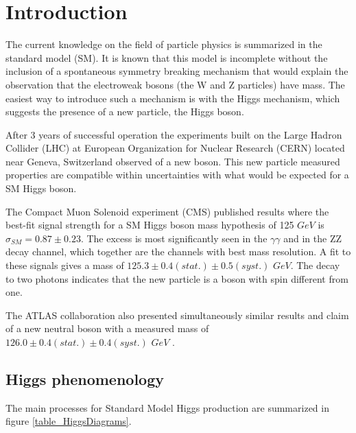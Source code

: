 \documentclass[%
reprint,
amsmath,
amssymb,
aps,
pra,
showkeys
]{revtex4-1}
\begin{document}
\setlength{\unitlength}{1mm}

\section{Introduction}

The current knowledge on the field of particle physics is summarized in the standard model (SM). It is known that
this model is incomplete without the inclusion of a spontaneous symmetry breaking mechanism that would explain
the observation that the electroweak bosons (the W and Z particles) have mass. The easiest way to introduce such
a mechanism is with the Higgs mechanism, which suggests the presence of a new particle, the Higgs boson.

After 3 years of successful operation the experiments built on the Large Hadron Collider (LHC) at European Organization 
for Nuclear Research (CERN) located near Geneva, Switzerland observed of a new boson. This new particle measured 
properties are compatible within uncertainties with what would be expected for a SM Higgs boson.

The Compact Muon Solenoid experiment (CMS) published results where the best-fit signal strength for a SM Higgs boson 
mass hypothesis of 125 $GeV$ is $\sigma_{SM}=0.87\pm0.23$. The excess is most significantly seen in the $\gamma\gamma$ 
and in the ZZ decay channel, which together are the channels with best mass resolution. A fit to these signals gives 
a mass of $125.3 \pm 0.4 (stat.) \pm 0.5 (syst.)$ $GeV$. The decay to two photons indicates that the new particle is 
a boson with spin different from one\cite{article:CMS-HIG-12-028}.

The ATLAS collaboration also presented simultaneously similar results and claim of a new neutral boson
with a measured mass of $126.0 \pm 0.4 (stat.) \pm 0.4 (syst.)$ $GeV$ \cite{article:CERN-PH-EP-2012-218}.

\subsection{Higgs phenomenology}

The main processes for Standard Model Higgs production are summarized in figure \ref{table_HiggsDiagrams}.
 
\end{document}
